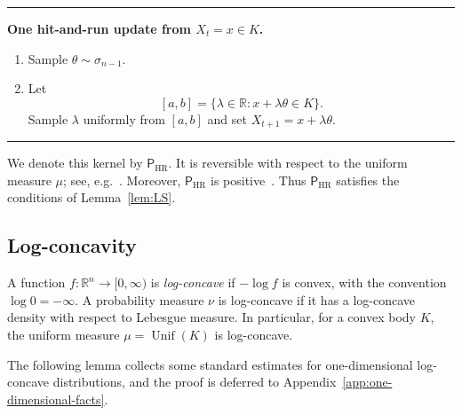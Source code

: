 \documentclass[11pt]{article}
\theoremstyle{definition}
\theoremstyle{remark}
\newcommand{\R}{\mathbb R}
\newcommand{\Unif}{\operatorname{Unif}}
\newcommand{\Id}{\mathsf I}
\newcommand{\HRzero}{\mathsf P_{\mathrm{HR}}}
\newcommand{\HR}{\mathsf P_{\mathrm{HR}}}
\begin{document}
\begin{center}
\begin{minipage}{0.86\textwidth}
\hrule
\smallskip
\textbf{One hit-and-run update from \(X_t=x\in K \).}
\begin{enumerate}[leftmargin=2em,itemsep=2pt,topsep=4pt]
\item Sample \(\theta\sim\sigma_{n-1}\).
\item Let
\[
 [a,b]=\{\lambda\in\R:x+\lambda\theta\in K\}.
\]
Sample \(\lambda\) uniformly from \([a,b]\) and set
\(X_{t+1}=x+\lambda\theta\).
\end{enumerate}
\smallskip
\hrule
\end{minipage}
\end{center}



We denote this kernel by \(\HR\).  It is reversible with respect to the uniform measure \(\mu\); see, e.g.~\cite[Section~2]{VempalaSurvey}. Moreover, $\HR$ is positive~\cite{RudolfUllrichPositivity}.  Thus \(\HR\) satisfies the conditions of Lemma~\ref{lem:LS}.



\subsection{Log-concavity}
A function $f:\R^n \rightarrow [0, \infty)$ is \emph{log-concave} if $-\log f$ is convex, with the convention $\log 0=-\infty$. A probability measure $\nu$ is log-concave if it has a log-concave density with respect to Lebesgue measure. In particular, for a convex body $K$, the uniform measure $\mu=\Unif(K)$ is log-concave.

The following lemma collects some standard estimates for one-dimensional
log-concave distributions, and the proof is deferred
to Appendix~\ref{app:one-dimensional-facts}.
\end{document}
